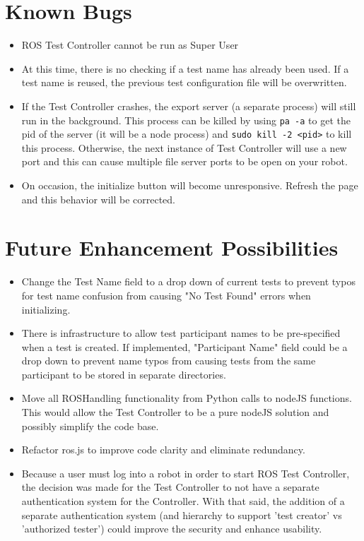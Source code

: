 \documentclass[onecolumn, draftclsnofoot,10pt, compsoc]{report}
\begin{document}
\section{Known Bugs}

\begin{itemize}
	\item ROS Test Controller cannot be run as Super User

	\item At this time, there is no checking if a test name has already been used. If a test name is reused, the previous test configuration file will be overwritten.

	\item If the Test Controller crashes, the export server (a separate process) will still run in the background. This process can be killed by using \texttt{pa -a} to get the pid of the server (it will be a node process) and \texttt{sudo kill -2 <pid>} to kill this process. Otherwise, the next instance of Test Controller will use a new port and this can cause multiple file server ports to be open on your robot.

	\item On occasion, the initialize button will become unresponsive. Refresh the page and this behavior will be corrected.
\end{itemize}

\section{Future Enhancement Possibilities}

\begin{itemize}
	\item Change the Test Name field to a drop down of current tests to prevent typos for test name confusion from causing "No Test Found" errors when initializing.

	\item There is infrastructure to allow test participant names to be pre-specified when a test is created. If implemented, "Participant Name" field could be a drop down to prevent name typos from causing tests from the same participant to be stored in separate directories.

	\item Move all ROSHandling functionality from Python calls to nodeJS functions. This would allow the Test Controller to be a pure nodeJS solution and possibly simplify the code base.

	\item Refactor ros.js to improve code clarity and eliminate redundancy.

	\item Because a user must log into a robot in order to start ROS Test Controller, the decision was made for the Test Controller to not have a separate authentication system for the Controller. With that said, the addition of a separate authentication system (and hierarchy to support 'test creator' vs 'authorized tester') could improve the security and enhance usability.
\end{itemize}
\end{document}
